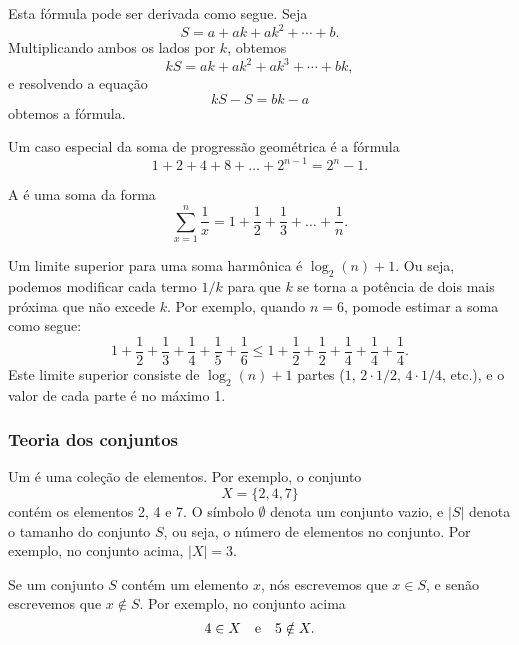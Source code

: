 Esta fórmula pode ser derivada como segue. Seja
\[ S = a + ak + ak^2 + \cdots + b .\]
Multiplicando ambos os lados por $k$, obtemos
\[ kS = ak + ak^2 + ak^3 + \cdots + bk,\]
e resolvendo a equação
\[ kS-S = bk-a\]
obtemos a fórmula.

Um caso especial da soma de progressão geométrica é a fórmula
\[1+2+4+8+\ldots+2^{n-1}=2^n-1.\]


A  é uma soma da forma
\[ \sum_{x=1}^n \frac{1}{x} = 1+\frac{1}{2}+\frac{1}{3}+\ldots+\frac{1}{n}.\]

Um limite superior para uma soma harmônica é $\log_2(n)+1$.
Ou seja, podemos modificar cada termo $1/k$ para que $k$ se torna
a potência de dois mais próxima que não excede $k$.
Por exemplo, quando $n=6$, pomode estimar a soma como segue:
\[ 1+\frac{1}{2}+\frac{1}{3}+\frac{1}{4}+\frac{1}{5}+\frac{1}{6} \le
1+\frac{1}{2}+\frac{1}{2}+\frac{1}{4}+\frac{1}{4}+\frac{1}{4}.\]
Este limite superior consiste de $\log_2(n)+1$ partes
($1$, $2 \cdot 1/2$, $4 \cdot 1/4$, etc.),
e o valor de cada parte é no máximo 1.

\subsubsection{Teoria dos conjuntos}


Um  é uma coleção de elementos.
Por exemplo, o conjunto
\[X=\{2,4,7\}\]
contém os elementos 2, 4 e 7.
O símbolo $\emptyset$ denota um conjunto vazio,
e $|S|$ denota o tamanho do conjunto $S$,
ou seja, o número de elementos no conjunto.
Por exemplo, no conjunto acima, $|X|=3$.

Se um conjunto $S$ contém um elemento $x$,
nós escrevemos que $x \in S$,
e senão escrevemos que $x \notin S$.
Por exemplo, no conjunto acima
\[4 \in X \hspace{10px}\textrm{e}\hspace{10px} 5 \notin X.\]

